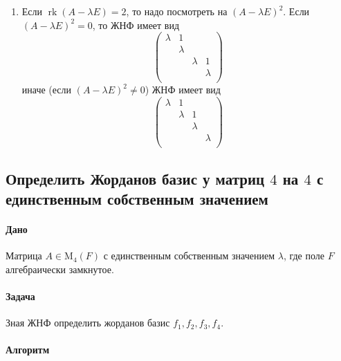 \documentclass{article}
\newcommand{\Matrix}[2]{\operatorname{\mathrm{M}_{#2}}(#1)}
\newcommand{\rk}{\operatorname{rk}}
\begin{document}
\begin{enumerate}
\item Если $\rk(A - \lambda E) = 2$, то надо посмотреть на $(A - \lambda E)^2$.
Если $(A - \lambda E)^2 = 0$, то ЖНФ имеет вид
\[
\begin{pmatrix}
{\lambda}&{1}&{}&{}\\
{}&{\lambda}&{}&{}\\
{}&{}&{\lambda}&{1}\\
{}&{}&{}&{\lambda}\\
\end{pmatrix}
\]
иначе (если $(A - \lambda E)^2 \neq 0$) ЖНФ имеет вид
\[
\begin{pmatrix}
{\lambda}&{1}&{}&{}\\
{}&{\lambda}&{1}&{}\\
{}&{}&{\lambda}&{}\\
{}&{}&{}&{\lambda}\\
\end{pmatrix}
\]
\end{enumerate}

\subsection{Определить Жорданов базис у матриц $4$ на $4$ с единственным собственным значением}

\paragraph{Дано}

Матрица $A \in \Matrix{F}{4}$ с единственным собственным значением $\lambda$, где поле $F$ алгебраически замкнутое.

\paragraph{Задача}

Зная ЖНФ определить жорданов базис $f_1, f_2, f_3, f_4$.

\paragraph{Алгоритм}
\end{document}
